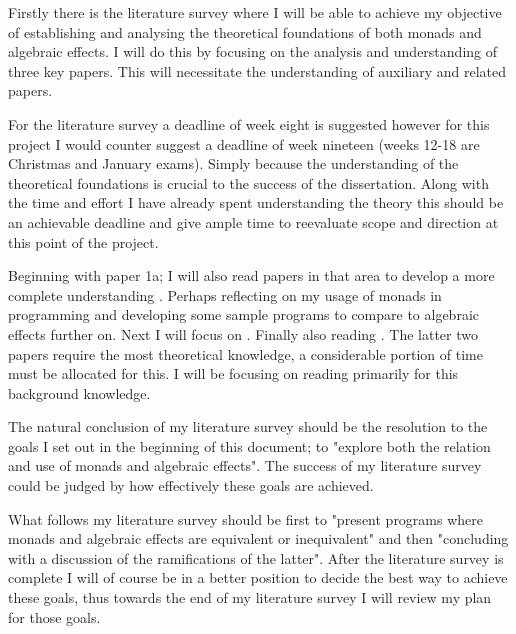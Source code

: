 \documentclass[a4paper,10pt]{article}
\begin{document}
Firstly there is the literature survey where I will be able to achieve my objective
of establishing and analysing the theoretical foundations of both monads and algebraic
effects.
I will do this by focusing on the analysis and understanding of three key papers.
This will necessitate the understanding of auxiliary and related papers.

For the literature survey a deadline of week eight is suggested however for this project I would
counter suggest a deadline of week nineteen (weeks 12-18 are Christmas and January exams).
Simply because the understanding of the theoretical foundations is crucial to the success of the
 dissertation. Along with the time and effort I have already spent understanding the theory this
should be an achievable deadline and give ample time to reevaluate scope and direction at this point of the project.

Beginning with paper 1a;
I will also read papers in that area to develop a more complete understanding
\cite{wadler2003marriage, wadler1994monads, PeytonJones:1993}.
Perhaps reflecting on my usage of monads in programming and developing some sample
programs to compare to algebraic effects further on.
Next I will focus on \cite{Moggi:hc}.
Finally \cite{Plotkin:2001jr} also reading \cite{plotkin2001adequacy, Plotkin:2002dw}.
The latter two papers require the most theoretical knowledge, a considerable portion
of time must be allocated for this.
I will be focusing on reading primarily \cite{barr1990category} for this background knowledge.

The natural conclusion of my literature survey should be the resolution to the goals I set out
in the beginning of this document; to "explore both the relation and use of monads and
algebraic effects".
The success of my literature survey could be judged by how effectively these goals are 
achieved.

What follows my literature survey should be first to
  "present programs where monads and algebraic effects are equivalent or inequivalent"
and then
  "concluding with a discussion of the ramifications of the latter".
After the literature survey is complete I will of course be in a better position to decide
the best way to achieve these goals, thus towards the end of my literature survey I will
review my plan for those goals.


\medskip



\end{document}
